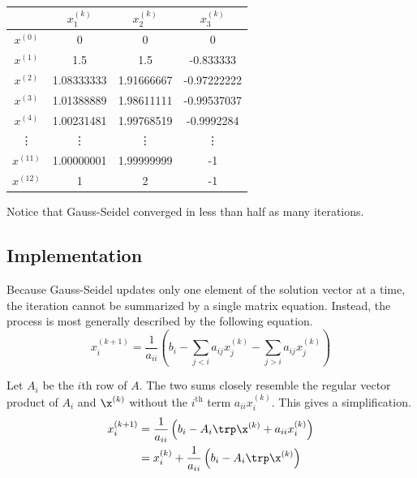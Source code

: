 \begin{center}
\begin{tabular}{c|ccc}
    & $x^{(k)}_1$ & $x^{(k)}_2$ & $x^{(k)}_3$ \\
    \hline
      $x^{(0)}$ & 0 & 0 & 0 \\
      $x^{(1)}$ & 1.5 & 1.5 & -0.833333 \\
      $x^{(2)}$ & 1.08333333 & 1.91666667 & -0.97222222 \\
      $x^{(3)}$ & 1.01388889 & 1.98611111 & -0.99537037 \\
      $x^{(4)}$ & 1.00231481 & 1.99768519 & -0.9992284 \\
      \vdots    & \vdots    & \vdots     & \vdots     \\
      $x^{(11)}$ & 1.00000001 & 1.99999999 & -1 \\
      $x^{(12)}$ & 1 & 2 & -1 \\
\end{tabular}
\end{center}
Notice that Gauss-Seidel converged in less than half as many iterations.

\subsection*{Implementation} %


Because Gauss-Seidel updates only one element of the solution vector at a time, the iteration cannot be summarized by a single matrix equation.
Instead, the process is most generally described by the following equation.
\begin{equation} \label{eq:gauss-seidel-full}
x^{(k+1)}_i = \frac{1}{a_{ii}} \left (b_i - \sum_{j < i}a_{ij}x^{(k)}_j - \sum_{j > i}a_{ij}x^{(k)}_j \right )
\end{equation}

Let $A_i$ be the $i$th row of $A$.
The two sums closely resemble the regular vector product of $A_i$ and $\x^{(k)}$ without the $i^{\text{th}}$ term $a_{ii}x^{(k)}_i$.
This gives a simplification.
\begin{align}
\nonumber x^{(k+1)}_i &= \frac{1}{a_{ii}} \left(b_i - A_i\trp\x^{(k)} + a_{ii}x^{(k)}_i \right)\\
&= x^{(k)}_i + \frac{1}{a_{ii}}\left( b_i - A_i\trp\x^{(k)}\right)
\label{eq:gauss_seidel}
\end{align}

